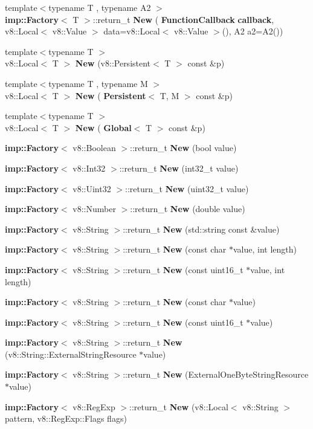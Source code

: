 \begin{DoxyCompactItemize}
\item 
{\footnotesize template$<$typename T , typename A2 $>$ }\\\textbf{ imp\+::\+Factory}$<$ T $>$\+::return\+\_\+t \textbf{ New} (\textbf{ Function\+Callback} \textbf{ callback}, v8\+::\+Local$<$ v8\+::\+Value $>$ data=v8\+::\+Local$<$ v8\+::\+Value $>$(), A2 a2=A2())
\item 
{\footnotesize template$<$typename T $>$ }\\v8\+::\+Local$<$ T $>$ \textbf{ New} (v8\+::\+Persistent$<$ T $>$ const \&p)
\item 
{\footnotesize template$<$typename T , typename M $>$ }\\v8\+::\+Local$<$ T $>$ \textbf{ New} (\textbf{ Persistent}$<$ T, M $>$ const \&p)
\item 
{\footnotesize template$<$typename T $>$ }\\v8\+::\+Local$<$ T $>$ \textbf{ New} (\textbf{ Global}$<$ T $>$ const \&p)
\item 
\textbf{ imp\+::\+Factory}$<$ v8\+::\+Boolean $>$\+::return\+\_\+t \textbf{ New} (bool value)
\item 
\textbf{ imp\+::\+Factory}$<$ v8\+::\+Int32 $>$\+::return\+\_\+t \textbf{ New} (int32\+\_\+t value)
\item 
\textbf{ imp\+::\+Factory}$<$ v8\+::\+Uint32 $>$\+::return\+\_\+t \textbf{ New} (uint32\+\_\+t value)
\item 
\textbf{ imp\+::\+Factory}$<$ v8\+::\+Number $>$\+::return\+\_\+t \textbf{ New} (double value)
\item 
\textbf{ imp\+::\+Factory}$<$ v8\+::\+String $>$\+::return\+\_\+t \textbf{ New} (std\+::string const \&value)
\item 
\textbf{ imp\+::\+Factory}$<$ v8\+::\+String $>$\+::return\+\_\+t \textbf{ New} (const char $\ast$value, int length)
\item 
\textbf{ imp\+::\+Factory}$<$ v8\+::\+String $>$\+::return\+\_\+t \textbf{ New} (const uint16\+\_\+t $\ast$value, int length)
\item 
\textbf{ imp\+::\+Factory}$<$ v8\+::\+String $>$\+::return\+\_\+t \textbf{ New} (const char $\ast$value)
\item 
\textbf{ imp\+::\+Factory}$<$ v8\+::\+String $>$\+::return\+\_\+t \textbf{ New} (const uint16\+\_\+t $\ast$value)
\item 
\textbf{ imp\+::\+Factory}$<$ v8\+::\+String $>$\+::return\+\_\+t \textbf{ New} (v8\+::\+String\+::\+External\+String\+Resource $\ast$value)
\item 
\textbf{ imp\+::\+Factory}$<$ v8\+::\+String $>$\+::return\+\_\+t \textbf{ New} (External\+One\+Byte\+String\+Resource $\ast$value)
\item 
\textbf{ imp\+::\+Factory}$<$ v8\+::\+Reg\+Exp $>$\+::return\+\_\+t \textbf{ New} (v8\+::\+Local$<$ v8\+::\+String $>$ pattern, v8\+::\+Reg\+Exp\+::\+Flags flags)
\end{DoxyCompactItemize}


